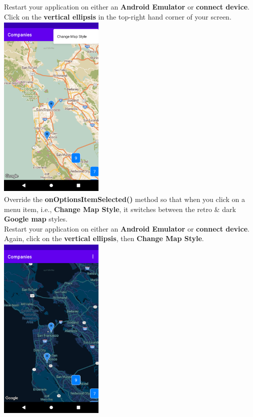 \documentclass{article}
\begin{document}
Restart your application on either an \textbf{Android Emulator} or \textbf{connect device}. Click on the \textbf{vertical ellipsis} in the top-right hand corner of your screen. \\ 

\includegraphics[width=5cm, height=9cm]{../../resources/img/practicals/05-companies-4.png}  \\

Override the \textbf{onOptionsItemSelected()} method so that when you click on a menu item, i.e., \textbf{Change Map Style}, it switches between the retro \& dark \textbf{Google map} styles. \\

Restart your application on either an \textbf{Android Emulator} or \textbf{connect device}. Again, click on the \textbf{vertical ellipsis}, then \textbf{Change Map Style}. \\ 

\includegraphics[width=5cm, height=9cm]{../../resources/img/practicals/05-companies-5.png} 
\end{document}
